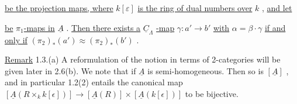 \begin{center}
\end{center}
\underline{be the projection maps, where}  $k[\varepsilon]$  \underline{is the ring of dual numbers over}  $k$  , \underline{and let}

\begin{center}
\end{center}
\underline{be}  $\pi_1$\underline{-maps in}  $\underline{A}$  . \underline{Then there exists a}  $\underline{C}_{\Lambda}$  \underline{-map}  $\gamma : a' \longrightarrow b'$  \underline{with}  $\alpha = \beta\cdot\gamma$ \underline{if and only if}  $(\pi_2)_{*}(a') \approx (\pi_2)_{*}(b')$  .

\underline{Remark} 1.3.(a)  A reformulation of the notion in terms of  2-categories will be given later in 2.6(b). We note that if  $\underline{A}$  is semi-homogeneous. Then so is  $[\underline{A}]$  , and in particular 1.2(2) entails the canonical map
$[\underline{A}(R \times_{k} k[\epsilon])] \longrightarrow [\underline{A}(R)] \times [\underline{A}(k[\epsilon])]$
to be bijective.

